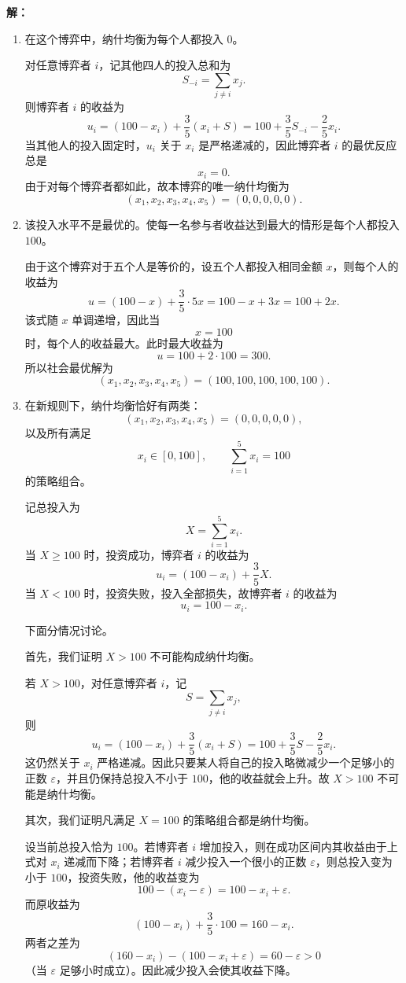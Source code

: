 \documentclass[12pt,a4paper]{article}
\begin{document}
\noindent\textbf{解：}
\begin{enumerate}[label=\alph*.]
  \item 在这个博弈中，纳什均衡为每个人都投入 \(0\)。
  
  对任意博弈者 \(i\)，记其他四人的投入总和为
  \[
    S_{-i}=\sum_{j\ne i}x_j.
  \]
  则博弈者 \(i\) 的收益为
  \[
    u_i=(100-x_i)+\frac{3}{5}(x_i+S)
    =100+\frac{3}{5}S_{-i}-\frac{2}{5}x_i.
  \]
  当其他人的投入固定时，\(u_i\) 关于 \(x_i\) 是严格递减的，因此博弈者 \(i\) 的最优反应总是
  \[
    x_i=0.
  \]
  由于对每个博弈者都如此，故本博弈的唯一纳什均衡为
  \[
    (x_1,x_2,x_3,x_4,x_5)=(0,0,0,0,0).
  \]

  \item 该投入水平不是最优的。使每一名参与者收益达到最大的情形是每个人都投入 \(100\)。
  
  由于这个博弈对于五个人是等价的，设五个人都投入相同金额 \(x\)，则每个人的收益为
  \[
    u=(100-x)+\frac{3}{5}\cdot 5x
    =100-x+3x
    =100+2x.
  \]
  该式随 \(x\) 单调递增，因此当
  \[
    x=100
  \]
  时，每个人的收益最大。此时最大收益为
  \[
    u=100+2\cdot 100=300.
  \]
  所以社会最优解为
  \[
    (x_1,x_2,x_3,x_4,x_5)=(100,100,100,100,100).
  \]

  \item 在新规则下，纳什均衡恰好有两类：
  \[
    (x_1,x_2,x_3,x_4,x_5)=(0,0,0,0,0),
  \]
  以及所有满足
  \[
    x_i\in[0,100],\qquad \sum_{i=1}^5x_i=100
  \]
  的策略组合。

  记总投入为
  \[
    X=\sum_{i=1}^5x_i.
  \]
  当 \(X\ge 100\) 时，投资成功，博弈者 \(i\) 的收益为
  \[
    u_i=(100-x_i)+\frac{3}{5}X.
  \]
  当 \(X<100\) 时，投资失败，投入全部损失，故博弈者 \(i\) 的收益为
  \[
    u_i=100-x_i.
  \]

  下面分情况讨论。

  首先，我们证明 \(X>100\) 不可能构成纳什均衡。
  
  若 \(X>100\)，对任意博弈者 \(i\)，记
  \[
    S=\sum_{j\ne i}x_j,
  \]
  则
  \[
    u_i=(100-x_i)+\frac{3}{5}(x_i+S)
    =100+\frac{3}{5}S-\frac{2}{5}x_i.
  \]
  这仍然关于 \(x_i\) 严格递减。因此只要某人将自己的投入略微减少一个足够小的正数 \(\varepsilon\)，并且仍保持总投入不小于 \(100\)，他的收益就会上升。故 \(X>100\) 不可能是纳什均衡。

  其次，我们证明凡满足 \(X=100\) 的策略组合都是纳什均衡。
  
  设当前总投入恰为 \(100\)。若博弈者 \(i\) 增加投入，则在成功区间内其收益由于上式对 \(x_i\) 递减而下降；若博弈者 \(i\) 减少投入一个很小的正数 \(\varepsilon\)，则总投入变为小于 \(100\)，投资失败，他的收益变为
  \[
    100-(x_i-\varepsilon)=100-x_i+\varepsilon.
  \]
  而原收益为
  \[
    (100-x_i)+\frac{3}{5}\cdot 100=160-x_i.
  \]
  两者之差为
  \[
    (160-x_i)-(100-x_i+\varepsilon)=60-\varepsilon>0
  \]
  （当 \(\varepsilon\) 足够小时成立）。因此减少投入会使其收益下降。


\end{enumerate}
\end{document}
